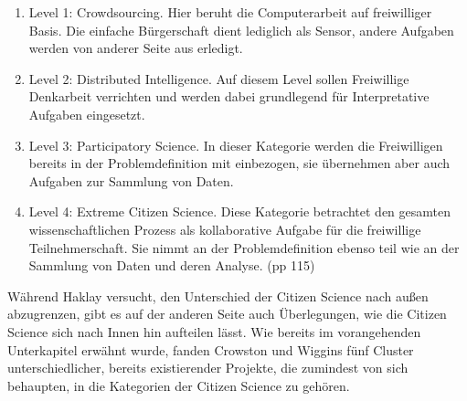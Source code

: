 \documentclass{article}
\begin{document}
\begin{enumerate}
\item{ Level 1: Crowdsourcing.
Hier beruht die Computerarbeit auf freiwilliger Basis. Die einfache Bürgerschaft dient lediglich als Sensor, andere Aufgaben werden von anderer Seite aus erledigt.}
\item{ Level 2: Distributed Intelligence.
Auf diesem Level sollen Freiwillige Denkarbeit verrichten und werden dabei grundlegend für Interpretative Aufgaben eingesetzt.}
\item{ Level 3: Participatory Science.
In dieser Kategorie werden die Freiwilligen bereits in der Problemdefinition mit einbezogen, sie übernehmen aber auch Aufgaben zur Sammlung von Daten.}
\item{ Level 4: Extreme Citizen Science.
Diese Kategorie betrachtet den gesamten wissenschaftlichen Prozess als kollaborative Aufgabe für die freiwillige Teilnehmerschaft. Sie nimmt an der Problemdefinition ebenso teil wie an der Sammlung von Daten und deren Analyse.}\cite{Haklay} (pp 115)
\end{enumerate}

Während Haklay versucht, den Unterschied der Citizen Science nach außen abzugrenzen, gibt es auf der anderen Seite auch Überlegungen, wie die Citizen Science sich nach Innen hin aufteilen lässt. Wie bereits im vorangehenden Unterkapitel erwähnt wurde, fanden Crowston und Wiggins fünf Cluster unterschiedlicher, bereits existierender Projekte, die zumindest von sich behaupten, in die Kategorien der Citizen Science zu gehören.
\end{document}
